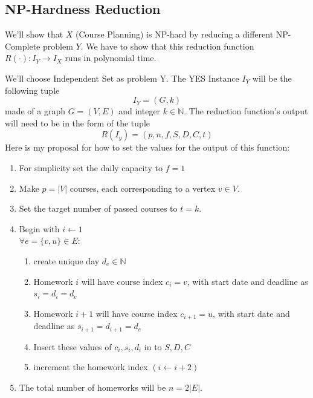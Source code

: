 \documentclass[11pt]{article}
\begin{document}

\subsection{NP-Hardness Reduction}
We'll show that $X$ (Course Planning) is NP-hard by reducing a different NP-Complete problem $Y$. We have to show that this
reduction function $R(\cdot) : I_Y \rightarrow I_X$ runs in polynomial time.

We'll choose Independent Set as problem Y. The YES Instance $I_Y$ will be the following tuple
$$I_Y = (G,k)$$ made of a graph $G=(V,E)$ and integer $k\in \mathbb{N}$.
The reduction function's output will need to be in the form of the tuple $$R(I_y) = (p,n,f,S,D,C,t)$$
Here is my proposal for how to set the values for the output of this function:

\begin{enumerate}
    \item For simplicity set the daily capacity to $f = 1$
    \item Make $p = |V|$ courses, each corresponding to a vertex $v \in V$.
    \item  Set the target number of passed courses to $t = k$.
    \item Begin with $i\leftarrow 1$ \\ $\forall e = \{v, u\} \in E$: 
 
    \begin{enumerate}
        \item create unique day $d_e \in \mathbb{N}$  
        \item Homework $i$ will have course index $c_i = v$, with start date and deadline as $s_i=d_i=d_e$
        \item Homework $i+1$ will have course index $c_{i+1} = u$, with start date and deadline as $s_{i+1}=d_{i+1}=d_e$
        \item Insert these values of $c_i,s_i,d_i$ in to $S,D,C$
        \item increment the homework index $(i\leftarrow i+2)$
    \end{enumerate}
    \item The total number of homeworks will be $n = 2|E|$.
\end{enumerate}
\end{document}
